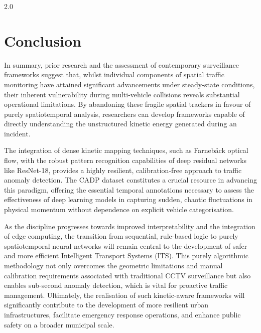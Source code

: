 \begin{spacing}{2.0}
\section{Conclusion}
In summary, prior research and the assessment of contemporary surveillance frameworks suggest that, whilst individual components of spatial traffic monitoring have attained significant advancements under steady-state conditions, their inherent vulnerability during multi-vehicle collisions reveals substantial operational limitations. By abandoning these fragile spatial trackers in favour of purely spatiotemporal analysis, researchers can develop frameworks capable of directly understanding the unstructured kinetic energy generated during an incident.

The integration of dense kinetic mapping techniques, such as Farnebäck optical flow, with the robust pattern recognition capabilities of deep residual networks like ResNet-18, provides a highly resilient, calibration-free approach to traffic anomaly detection. The CADP dataset constitutes a crucial resource in advancing this paradigm, offering the essential temporal annotations necessary to assess the effectiveness of deep learning models in capturing sudden, chaotic fluctuations in physical momentum without dependence on explicit vehicle categorisation.

As the discipline progresses towards improved interpretability and the integration of edge computing, the transition from sequential, rule-based logic to purely spatiotemporal neural networks will remain central to the development of safer and more efficient Intelligent Transport Systems (ITS). This purely algorithmic methodology not only overcomes the geometric limitations and manual calibration requirements associated with traditional CCTV surveillance but also enables sub-second anomaly detection, which is vital for proactive traffic management. Ultimately, the realisation of such kinetic-aware frameworks will significantly contribute to the development of more resilient urban infrastructures, facilitate emergency response operations, and enhance public safety on a broader municipal scale.
\end{spacing}
\newpage

